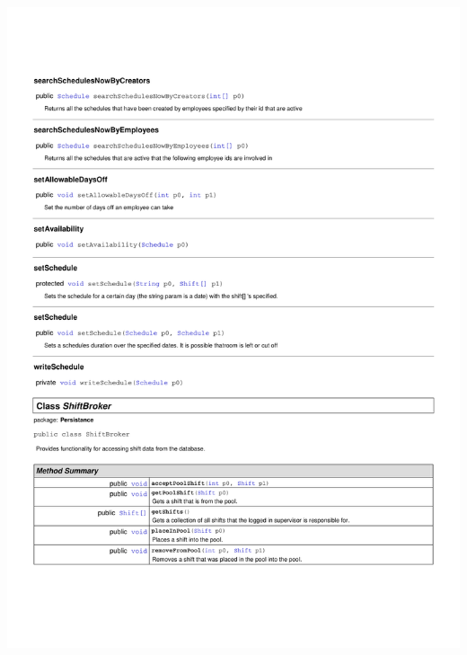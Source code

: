 \documentclass[letterpaper,12pt]{report}
\begin{document}
\includegraphics[scale=0.9,trim=20mm 30mm 25mm 25mm]{externals/PersistanceDataDictionary7.pdf}
\newpage
\end{document}
